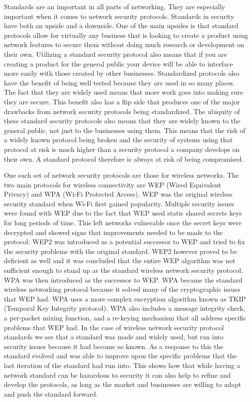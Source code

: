 Standards are an important in all parts of networking.  They are especially important when it comes to network security protocols.  Standards in security have both an upside and a downside.  One of the main upsides is that standard protocols allow for virtually any business that is looking to create a product using network features to secure them without doing much research or development on their own.  Utilizing a standard security protocol also means that if you are creating a product for the general public your device will be able to interface more easily with those created by other businesses.  Standardized protocols also have the benefit of being well tested because they are used in so many places.  The fact that they are widely used means that more work goes into making sure they are secure.  This benefit also has a flip side that produces one of the major drawbacks from network security protocols being standardized. The ubiquity of these standard security protocols also means that they are widely known to the general public, not just to the businesses using them.  This means that the risk of a widely known protocol being broken and the security of systems using that protocol at risk is much higher than a security protocol a company develops on their own.  A standard protocol therefore is always at risk of being compromised.  

One such set of network security protocols are those for wireless networks.  The two main protocols for wireless connectivity are WEP (Wired Equivalent Privacy) and WPA (Wi-Fi Protected Access).  WEP was the original wireless security standard when Wi-Fi first gained popularity.  Multiple security issues were found with WEP due to the fact that WEP used static shared secrets keys for long periods of time.  This left networks vulnerable once the secret keys were decrypted and showed signs that improvements needed to be made to the protocol\cite{5711033}. WEP2 was introduced as a potential successor to WEP and tried to fix the security problems with the original standard.  WEP2 however proved to be deficient as well and it was concluded that the entire WEP algorithm was not sufficient enough to stand up as the standard wireless network security protocol\cite{5234856}. WPA was then introduced as the successor to WEP.  WPA became the standard wireless networking protocol because it solved many of the cryptographic issues that WEP had.  WPA uses a more complex encryption algorithm known as TKIP (Temporal Key Integrity protocol)\cite{5234856}.  WPA also includes a message integrity check, a per-packet mixing function, and a re-keying mechanism that all address specific problems that WEP had.  In the case of wireless network security protocol standards we see that a standard was made and widely used, but ran into security issues because it had become so known.  As a response to this the standard evolved and was able to improve upon the specific problems that the last iteration of the standard had run into.  This shows how that while having a network standard can be hazardous to security it can also help to refine and develop the protocols, as long as the market and businesses are willing to adapt and push the standard forward.  
